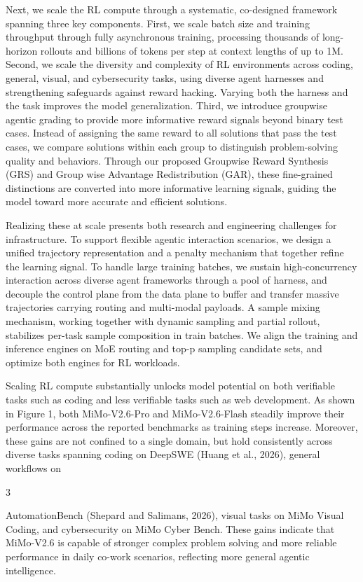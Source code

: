 \documentclass[
  10
]{article}
\begin{document}
Next, we scale the RL compute through a systematic, co-designed
framework spanning three key components. First, we scale batch size and
training throughput through fully asynchronous training, processing
thousands of long-horizon rollouts and billions of tokens per step at
context lengths of up to 1M. Second, we scale the diversity and
complexity of RL environments across coding, general, visual, and
cybersecurity tasks, using diverse agent harnesses and strengthening
safeguards against reward hacking. Varying both the harness and the task
improves the model generalization. Third, we introduce groupwise agentic
grading to provide more informative reward signals beyond binary test
cases. Instead of assigning the same reward to all solutions that pass
the test cases, we compare solutions within each group to distinguish
problem-solving quality and behaviors. Through our proposed Groupwise
Reward Synthesis (GRS) and Group wise Advantage Redistribution (GAR),
these fine-grained distinctions are converted into more informative
learning signals, guiding the model toward more accurate and efficient
solutions.

Realizing these at scale presents both research and engineering
challenges for infrastructure. To support flexible agentic interaction
scenarios, we design a unified trajectory representation and a penalty
mechanism that together refine the learning signal. To handle large
training batches, we sustain high-concurrency interaction across diverse
agent frameworks through a pool of harness, and decouple the control
plane from the data plane to buffer and transfer massive trajectories
carrying routing and multi-modal payloads. A sample mixing mechanism,
working together with dynamic sampling and partial rollout, stabilizes
per-task sample composition in train batches. We align the training and
inference engines on MoE routing and top-p sampling candidate sets, and
optimize both engines for RL workloads.

Scaling RL compute substantially unlocks model potential on both
verifiable tasks such as coding and less verifiable tasks such as web
development. As shown in Figure 1, both MiMo-V2.6-Pro and
MiMo-V2.6-Flash steadily improve their performance across the reported
benchmarks as training steps increase. Moreover, these gains are not
confined to a single domain, but hold consistently across diverse tasks
spanning coding on DeepSWE (Huang et al., 2026), general workflows on

3

AutomationBench (Shepard and Salimans, 2026), visual tasks on MiMo
Visual Coding, and cybersecurity on MiMo Cyber Bench. These gains
indicate that MiMo-V2.6 is capable of stronger complex problem solving
and more reliable performance in daily co-work scenarios, reflecting
more general agentic intelligence.
\end{document}
